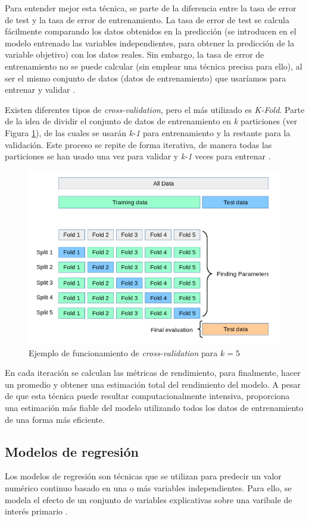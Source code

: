 \documentclass[12pt,a4paper,Spanish]{article}
\begin{document}
Para entender mejor esta técnica, se parte de la diferencia entre la tasa de error de test y la tasa de error de entrenamiento. La tasa de error de test se calcula fácilmente comparando los datos obtenidos en la predicción (se introducen en el modelo entrenado las variables independientes, para obtener la predicción de la variable objetivo) con los datos reales. Sin embargo, la tasa de error de entrenamiento no se puede calcular (sin emplear una técnica precisa para ello), al ser el mismo conjunto de datos (datos de entrenamiento) que usaríamos para entrenar y validar \cite{gareth2013introduction}.
\newline

Existen diferentes tipos de \textit{cross-validation}, pero el más utilizado es \textit{K-Fold}. Parte de la idea de dividir el conjunto de datos de entrenamiento en \textit{k} particiones (ver Figura \ref{fig:cross-validation}), de las cuales se usarán \textit{k-1} para entrenamiento y la restante para la validación. Este proceso se repite de forma iterativa, de manera todas las particiones se han usado una vez para validar y \textit{k-1} veces para entrenar \cite{hastie2009elements}.
\begin{figure}[H]
	\centering
	\includegraphics[width=0.7\linewidth]{figs/cross-validation}
	\caption{Ejemplo de funcionamiento de \textit{cross-validation} para $k = 5$ \cite{crossvalidation}}
	\label{fig:cross-validation}
\end{figure}
En cada iteración se calculan las métricas de rendimiento, para finalmente, hacer un promedio y obtener una estimación total del rendimiento del modelo.
A pesar de que esta técnica puede resultar computacionalmente intensiva, proporciona una estimación más fiable del modelo utilizando todos los datos de entrenamiento de una forma más eficiente.



\subsection{Modelos de regresión}
Los modelos de regresión son técnicas que se utilizan para predecir un valor numérico continuo basado en una o más variables independientes. Para ello, se modela el efecto de un conjunto de variables explicativas sobre una varibale de interés primario \autocite{fahrmeir2013regression}.
\newline
\end{document}
